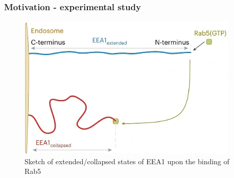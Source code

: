 \documentclass[handout]{beamer}
\begin{document}
\begin{frame}
    \frametitle{Motivation - experimental study}
    \begin{figure}[h]
        \includegraphics[height=6.9cm]{./Singh_intro_a.png}
        \caption{
            Sketch of extended/collapsed states of EEA1 upon the binding of Rab5
            \cite{Singh:2022}
        }
    \end{figure}
\end{frame}
\end{document}
